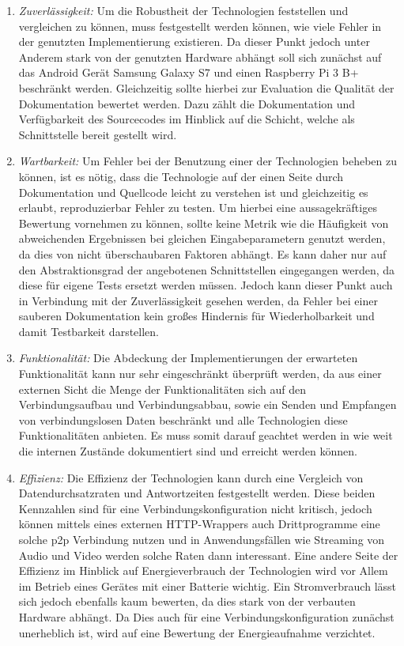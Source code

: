     	\begin{enumerate}
    	\item {\it Zuverlässigkeit:} 
    	Um die Robustheit der Technologien feststellen und vergleichen zu können, muss festgestellt werden können, wie viele Fehler in der genutzten Implementierung existieren. Da dieser Punkt jedoch unter Anderem stark von der genutzten Hardware abhängt soll sich zunächst auf das Android Gerät Samsung Galaxy S7 und einen Raspberry Pi 3 B+ beschränkt werden. Gleichzeitig sollte hierbei zur Evaluation die Qualität der Dokumentation bewertet werden. Dazu zählt die Dokumentation und Verfügbarkeit des Sourcecodes im Hinblick auf die Schicht, welche als Schnittstelle bereit gestellt wird.
    	\item {\it Wartbarkeit:} Um Fehler bei der Benutzung einer der Technologien beheben zu können, ist es nötig, dass die Technologie auf der einen Seite durch Dokumentation und Quellcode leicht zu verstehen ist und gleichzeitig es erlaubt, reproduzierbar Fehler zu testen. Um hierbei eine aussagekräftiges Bewertung vornehmen zu können, sollte keine Metrik wie die Häufigkeit von abweichenden Ergebnissen bei gleichen Eingabeparametern genutzt werden, da dies von nicht überschaubaren Faktoren abhängt. Es kann daher nur auf den Abstraktionsgrad der angebotenen Schnittstellen eingegangen werden, da diese für eigene Tests ersetzt werden müssen. Jedoch kann dieser Punkt auch in Verbindung mit der Zuverlässigkeit gesehen werden, da Fehler bei einer sauberen Dokumentation kein großes Hindernis für Wiederholbarkeit und damit Testbarkeit darstellen.
    	\item {\it Funktionalität:}
    	Die Abdeckung der Implementierungen der erwarteten Funktionalität kann nur sehr eingeschränkt überprüft werden, da aus einer externen Sicht die Menge der Funktionalitäten sich auf den Verbindungsaufbau und Verbindungsabbau, sowie ein Senden und Empfangen von verbindungslosen Daten beschränkt und alle Technologien diese Funktionalitäten anbieten. Es muss somit darauf geachtet werden in wie weit die internen Zustände dokumentiert sind und erreicht werden können.
    	\item {\it Effizienz:}
    	Die Effizienz der Technologien kann durch eine Vergleich von Datendurchsatzraten und Antwortzeiten festgestellt werden. Diese beiden Kennzahlen sind für eine Verbindungskonfiguration nicht kritisch, jedoch können mittels eines externen HTTP-Wrappers auch Drittprogramme eine solche p2p Verbindung nutzen und in Anwendungsfällen wie Streaming von Audio und Video werden solche Raten dann interessant. Eine andere Seite der Effizienz im Hinblick auf Energieverbrauch der Technologien wird vor Allem im Betrieb eines Gerätes mit einer Batterie wichtig. Ein Stromverbrauch lässt sich jedoch ebenfalls kaum bewerten, da dies stark von der verbauten Hardware abhängt. Da Dies auch für eine Verbindungskonfiguration zunächst unerheblich ist, wird auf eine Bewertung der Energieaufnahme verzichtet.

\end{enumerate}
